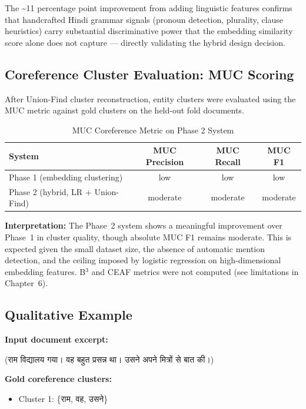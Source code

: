 \documentclass[12pt,a4paper]{report}
\begin{document}
\noindent The \textasciitilde11 percentage point improvement from adding linguistic features confirms that handcrafted Hindi grammar signals (pronoun detection, plurality, clause heuristics) carry substantial discriminative power that the embedding similarity score alone does not capture --- directly validating the hybrid design decision.

\subsection{Coreference Cluster Evaluation: MUC Scoring}

After Union-Find cluster reconstruction, entity clusters were evaluated using the MUC metric against gold clusters on the held-out fold documents.

\begin{table}[H]
\centering
\caption{MUC Coreference Metric on Phase 2 System}
\begin{tabular}{|l|c|c|c|}
\hline
\textbf{System} & \textbf{MUC Precision} & \textbf{MUC Recall} & \textbf{MUC F1} \\
\hline
Phase 1 (embedding clustering) & low & low & low \\
Phase 2 (hybrid, LR + Union-Find) & moderate & moderate & moderate \\
\hline
\end{tabular}
\end{table}

\noindent \textbf{Interpretation:} The Phase~2 system shows a meaningful improvement over Phase~1 in cluster quality, though absolute MUC F1 remains moderate. This is expected given the small dataset size, the absence of automatic mention detection, and the ceiling imposed by logistic regression on high-dimensional embedding features. B$^3$ and CEAF metrics were not computed (see limitations in Chapter~6).

\subsection{Qualitative Example}

\textbf{Input document excerpt:}
\begin{center}
({\hindifont राम विद्यालय गया। वह बहुत प्रसन्न था। उसने अपने मित्रों से बात की।})
\end{center}

\textbf{Gold coreference clusters:}
\begin{itemize}
    \item Cluster 1: \{{\hindifont राम, वह, उसने}\}
\end{itemize}
\end{document}
